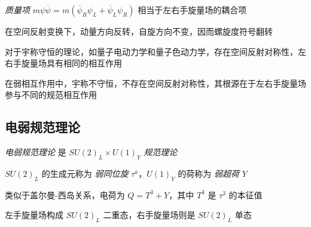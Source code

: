 \documentclass[oneside,a4paper,openany,11pt]{ctexbook}
\begin{document}
\emph{质量项} $m\psi\overline{\psi}=m(\overline{\psi}_R \psi_L+\overline{\psi}_L \psi_R)$ 相当于左右手旋量场的耦合项

在空间反射变换下，动量方向反转，自旋方向不变，因而螺旋度符号翻转

对于宇称守恒的理论，如量子电动力学和量子色动力学，存在空间反射对称性，左右手旋量场具有相同的相互作用

在弱相互作用中，宇称不守恒，不存在空间反射对称性，其根源在于左右手旋量场参与不同的规范相互作用

\subsection{电弱规范理论}

\emph{电弱规范理论} 是 $SU(2)_L \times U(1)_Y$ \emph{规范理论}

$SU(2)_L$ 的生成元称为 \emph{弱同位旋} $\tau^a$，$U(1)_Y$ 的荷称为 \emph{弱超荷} $Y$

类似于盖尔曼-西岛关系，电荷为 $Q=T^3+Y$，其中 $T^3$ 是 $\tau^3$ 的本征值

左手旋量场构成 $SU(2)_L$ 二重态，右手旋量场则是 $SU(2)_L$ 单态

\end{document}
